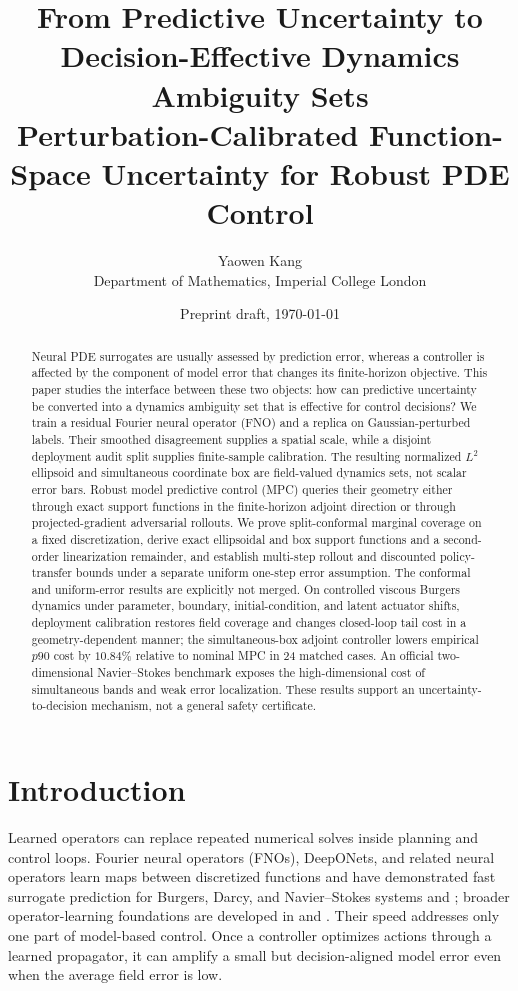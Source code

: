 \documentclass[10pt]{article}
\title{\vspace{-1.4em}\textbf{From Predictive Uncertainty to
Decision-Effective Dynamics Ambiguity Sets}\\
\large Perturbation-Calibrated Function-Space Uncertainty for Robust PDE Control}
\author{Yaowen Kang\\
\small Department of Mathematics, Imperial College London}
\date{Preprint draft, \today}
\begin{document}
\raggedbottom
\maketitle

\begin{abstract}
Neural PDE surrogates are usually assessed by prediction error, whereas a
controller is affected by the component of model error that changes its
finite-horizon objective. This paper studies the interface between these two
objects: how can predictive uncertainty be converted into a dynamics
ambiguity set that is effective for control decisions? We train a residual
Fourier neural operator (FNO) and a replica on Gaussian-perturbed labels. Their
smoothed disagreement supplies a spatial scale, while a disjoint deployment
audit split supplies finite-sample calibration. The resulting normalized
$L^2$ ellipsoid and simultaneous coordinate box are field-valued dynamics
sets, not scalar error bars. Robust model predictive control (MPC) queries
their geometry either through exact support functions in the finite-horizon
adjoint direction or through projected-gradient adversarial rollouts. We prove
split-conformal marginal coverage on a fixed discretization, derive exact
ellipsoidal and box support functions and a second-order linearization
remainder, and establish multi-step rollout and discounted policy-transfer
bounds under a separate uniform one-step error assumption. The conformal and
uniform-error results are explicitly not merged. On controlled viscous
Burgers dynamics under parameter, boundary, initial-condition, and latent
actuator shifts, deployment calibration restores field coverage and changes
closed-loop tail cost in a geometry-dependent manner; the simultaneous-box
adjoint controller lowers empirical $p90$ cost by $10.84\%$ relative to
nominal MPC in 24 matched cases. An official two-dimensional Navier--Stokes
benchmark exposes the high-dimensional cost of simultaneous bands and weak
error localization. These results support an uncertainty-to-decision
mechanism, not a general safety certificate.
\end{abstract}

\section{Introduction}

Learned operators can replace repeated numerical solves inside planning and
control loops. Fourier neural operators (FNOs), DeepONets, and related neural
operators learn maps between discretized functions and have demonstrated fast
surrogate prediction for Burgers, Darcy, and Navier--Stokes systems
\cite{li2021fno} and \cite{lu2021deeponet}; broader operator-learning
foundations are developed in \cite{kovachki2023neuraloperator} and
\cite{boulle2024guide}.
Their speed addresses only one part of model-based control. Once a controller
optimizes actions through a learned propagator, it can amplify a small but
decision-aligned model error even when the average field error is low.
\end{document}
